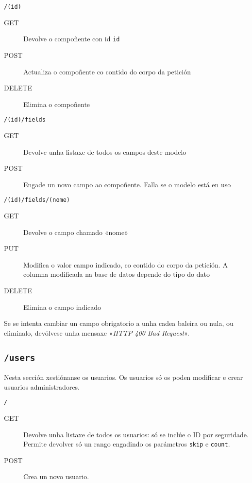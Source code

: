 \texttt{/(id)}

\begin{description}
    \item[GET] Devolve o compoñente con id \texttt{id}
    \item[POST] Actualiza o compoñente co contido do corpo da petición
    \item[DELETE] Elimina o compoñente
\end{description}

\newpage

\texttt{/(id)/fields}

\begin{description}
    \item[GET] Devolve unha listaxe de todos os campos deste modelo
    \item[POST] Engade un novo campo ao compoñente. Falla se o modelo está en uso
\end{description}

\texttt{/(id)/fields/(nome)}

\begin{description}
    \item[GET] Devolve o campo chamado «nome»
    \item[PUT] Modifica o valor campo indicado, co contido do corpo da petición. A columna modificada na base de datos depende do tipo do dato
    \item[DELETE] Elimina o campo indicado
\end{description}

Se se intenta cambiar un campo obrigatorio a unha cadea baleira ou nula, ou eliminalo, devólvese unha mensaxe «\textit{HTTP 400 Bad Request}».

\subsection{\texttt{/users}}

Nesta sección xestiónanse os usuarios. Os usuarios só os poden modificar e crear usuarios administradores.

\texttt{/}

\begin{description}
    \item[GET] Devolve unha listaxe de todos os usuarios: só se inclúe o ID por seguridade. Permite devolver só un rango engadindo os parámetros \texttt{skip} e \texttt{count}.
    \item[POST] Crea un novo usuario.
\end{description}

